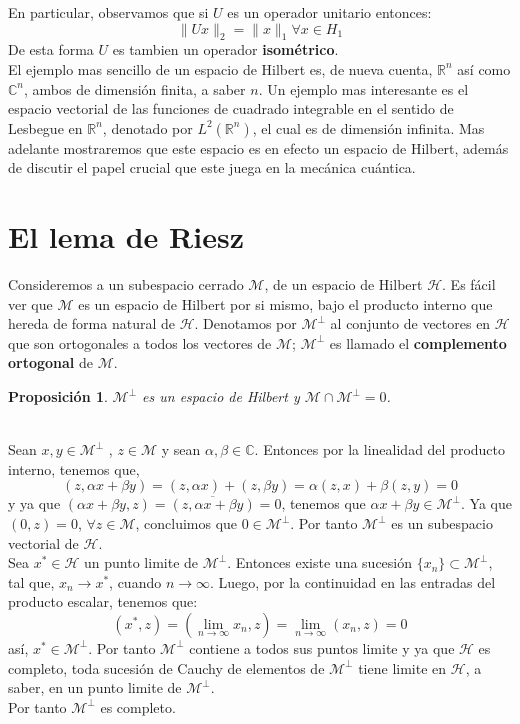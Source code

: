 \documentclass[12pt]{book}
\numberwithin{equation}{chapter}
\newtheorem{proposition}[theorem]{Proposici\'on}
\def\n{\noindent}
\def\ol{\overline}
\def\R{\mathbb{R}}
\def\C{\mathbb{C}}
\def\rar{\rightarrow}
\def\H{\mathcal{H}}
\def\M{\mathcal{M}}
\begin{document}
En particular, observamos que si $U$ es un operador unitario entonces:
$$ \| Ux \|_{2} = \| x \|_{1} \forall x \in H_{1} $$
De esta forma $U$ es tambien un operador {\bf isom\'etrico}.\\

El ejemplo mas sencillo de un espacio de Hilbert es, de nueva cuenta, $\R^{n}$ as\'i como $\C^{n}$, ambos de dimensi\'on finita, a saber $n$. Un ejemplo mas interesante es el espacio vectorial de las funciones de cuadrado integrable en el sentido de Lesbegue en $\R^{n}$, denotado por $L^{2}(\R^{n})$, el cual es de dimensi\'on infinita. Mas adelante mostraremos que este espacio es en efecto un espacio de Hilbert, adem\'as de discutir el papel crucial que este juega en la mec\'anica cu\'antica.

\vspace{5 mm}

\section{El lema de Riesz}
Consideremos a un subespacio cerrado $\M$, de un espacio de Hilbert $\H$. Es f\'acil ver que $\M$ es un espacio de Hilbert por si mismo, bajo el producto interno que hereda de forma natural de $\H$. Denotamos por $\M^{\perp}$ al conjunto de vectores en $\H$ que son ortogonales a todos los vectores de $\M$; $\M^{\perp}$ es llamado el {\bf complemento ortogonal} de $\M$.\\

\begin{proposition}
$\M^{\perp}$ es un espacio de Hilbert y $\M \cap \M^{\perp}= 0$.
\end{proposition}
\n {\bf Demostraci\'on}\\
Sean $ x,y \in \M^{\perp} $ , $z\in \M$ y sean $\alpha , \beta \in \C$. Entonces por la linealidad del producto interno, tenemos que,
$$ (z,\alpha x + \beta y)= (z,\alpha x) + (z,\beta y)= \alpha (z,x) + \beta (z,y)=0 $$
y ya que $(\alpha x + \beta y,z)= \ol{(z,\alpha x + \beta y)}=0 $, tenemos que $ \alpha x + \beta y \in \M^{\perp} $. Ya que $(0,z)=0$, $\forall z \in \M$, concluimos que $0 \in \M^{\perp}$. Por tanto $\M^{\perp}$ es un subespacio vectorial de $\H$.\\ 

Sea $x^{*} \in \H$ un punto limite de $\M^{\perp}$. Entonces existe una sucesi\'on $\{ x_{n} \} \subset \M^{\perp}$, tal que, $ x_{n} \rar x^{*} $, cuando $n \rar \infty$. Luego, por la continuidad en las entradas del producto escalar, tenemos que:
$$ (x^{*},z) = \left(\lim_{n \rar \infty} x_{n},z  \right) = \lim_{n\rar \infty}(x_{n},z)=0 $$  
as\'i, $ x^{*} \in \M^{\perp} $. Por tanto $\M^{\perp}$ contiene a todos sus puntos limite y ya que $\H$ es completo, toda sucesi\'on de Cauchy de elementos de $\M^{\perp}$ tiene limite en $\H$, a saber, en un punto limite de $\M^{\perp}$.\\
Por tanto $\M^{\perp}$ es completo. \\
\end{document}
